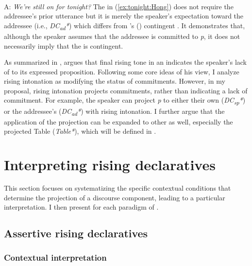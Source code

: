 \documentclass[output=paper,colorlinks,citecolor=brown]{langscibook}
\begin{document}
\ea \label{ex:tonight:Hong} \\
    A: \textit{We’re still on for tonight?}
\z
The  in (\ref{ex:tonight:Hong}) does not require the addressee’s prior utterance but it is merely the speaker’s expectation toward the addressee (i.e., \textit{DC\textsubscript{ad}*}) which differs from
\citeauthor{gunlogson2008question}'s (\citeyear{gunlogson2008question}) contingent . It demonstrates that, although the speaker assumes that the addressee is committed to \textit{p}, it does not necessarily imply that the  is contingent. 

As summarized in , \citet{rudin2018risinga, rudin2022intonational} argues that final rising tone in an  indicates the speaker's lack of  to its expressed proposition. Following some core ideas of his view, I analyze rising intonation as modifying the status of commitments. However, in my proposal, rising intonation projects commitments, rather than indicating a lack of commitment. For example, the speaker can project \textit{p} to either their own  (\textit{DC\textsubscript{sp}*}) or the addressee’s (\textit{DC\textsubscript{ad}*}) with rising intonation. I further argue that the application of the projection can be expanded to other  as well, especially the projected Table (\textit{Table*}), which will be defined in .

\section{Interpreting rising declaratives}
\label{sec:intris:Hong}

This section focuses on systematizing the specific contextual conditions that determine the projection of a discourse component, leading to a particular interpretation. I then present  for each paradigm of .

\subsection{Assertive rising declaratives}
\label{sec:ard:Hong}

\subsubsection{Contextual interpretation}
\label{sec:ardcont:Hong}
\end{document}
